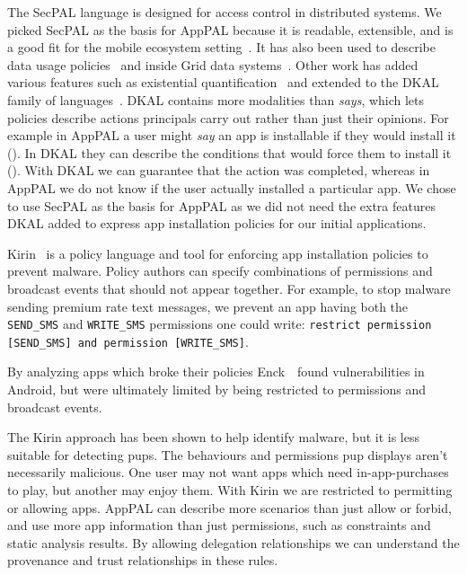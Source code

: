 \documentclass[]{llncs}
\newcommand{\citep}[1]{\cite{#1}}
\begin{document}
The SecPAL language is designed for access control in distributed systems.
We picked SecPAL as the basis for AppPAL because it is readable, extensible, and is a good fit for the mobile ecosystem setting~\citep{Hallett:2014un}.
It has also been used to describe data usage policies~\cite{Aziz:2011vt} and inside Grid data systems~\cite{Humphrey:2007wc}.
Other work has added various features such as existential
quantification~\cite{Becker:2009vt} and extended to the DKAL family of languages~\cite{Gurevich:2008fz,Gurevich:Qo5E3M3}.
DKAL contains more modalities than \emph{says}, which lets policies describe actions principals carry out rather than just their opinions.
For example in AppPAL a user might \emph{say} an app is installable if they would install it ().
In DKAL they can describe the conditions that would force them to install it ().
With DKAL we can guarantee that the action was completed, whereas in AppPAL we do not know if the user actually installed a particular app.
We chose to use SecPAL as the basis for AppPAL as we did not need the extra features DKAL added to express app installation policies for our initial applications.

Kirin~\cite{Enck:2009ko} is a policy language and tool for enforcing app installation policies to prevent malware.
Policy authors can specify combinations of permissions and broadcast events that should not appear together.
For example, to stop malware sending premium rate text messages, we prevent an
app having both the \texttt{SEND\_SMS} and \texttt{WRITE\_SMS} permissions one
could write: \texttt{restrict permission [SEND\_SMS] and permission [WRITE\_SMS]}.

By analyzing apps which broke their policies Enck~\etal~found vulnerabilities in Android, but were ultimately limited by being restricted to permissions and broadcast events.

The Kirin approach has been shown to help identify malware, but it is less suitable for detecting \acp{pup}.
The behaviours and permissions \ac{pup} displays aren't necessarily malicious.
One user may not want apps which need in-app-purchases to play, but another may enjoy them.
With Kirin we are restricted to permitting or allowing apps.
AppPAL can describe more scenarios than just allow or forbid, and use more app information than just permissions, such as constraints and static analysis results.
By allowing delegation relationships we can understand the provenance and trust relationships in these rules.
\end{document}

